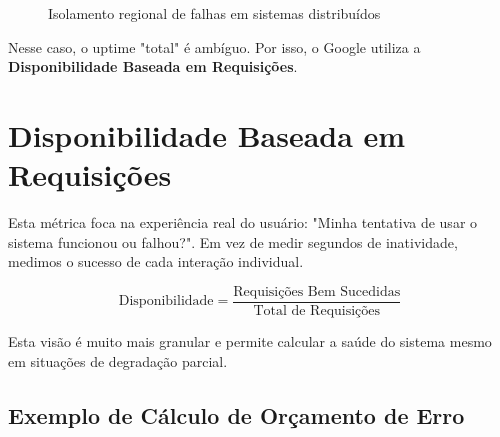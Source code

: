 \documentclass[12pt,a4paper]{report}
\begin{document}
\begin{figure}[h]
    \centering
    \caption{Isolamento regional de falhas em sistemas distribuídos}
    \label{fig:distribuido}
\end{figure}

Nesse caso, o uptime "total" é ambíguo. Por isso, o Google utiliza a \textbf{Disponibilidade Baseada em Requisições}.

\section{Disponibilidade Baseada em Requisições}

Esta métrica foca na experiência real do usuário: "Minha tentativa de usar o sistema funcionou ou falhou?". Em vez de medir segundos de inatividade, medimos o sucesso de cada interação individual.

\begin{equation}
\text{Disponibilidade} = \frac{\text{Requisições Bem Sucedidas}}{\text{Total de Requisições}}
\end{equation}

Esta visão é muito mais granular e permite calcular a saúde do sistema mesmo em situações de degradação parcial.

\subsection{Exemplo de Cálculo de Orçamento de Erro}
\end{document}
